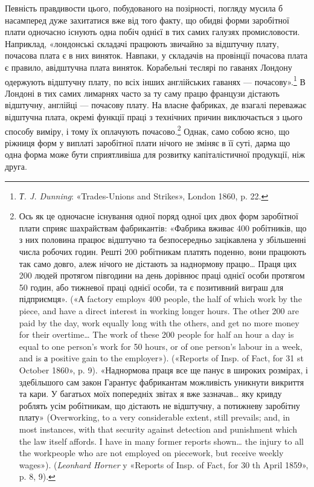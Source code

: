Певність правдивости цього, побудованого на позірності, погляду
мусила б насамперед дуже захитатися вже від того факту,
що обидві форми заробітної плати одночасно існують одна побіч
однієї в тих самих галузях промисловости. Наприклад, «лондонські
складачі працюють звичайно за відштучну плату, почасова
плата є в них виняток. Навпаки, у складачів на провінції
почасова плата є правило, авідштучна плата виняток. Корабельні
теслярі по гаванях Лондону одержують відштучну плату, по
всіх інших англійських гаванях — почасову».\footnote{
\emph{Т. J. Dunning}: «Trades-Unions and Strikes», London 1860,
p. 22.
} В Лондоні в
тих самих лимарнях часто за ту саму працю французи дістають
відштучну, англійці — почасову плату. На власне фабриках,
де взагалі переважає відштучна плата, окремі функції праці з
технічних причин виключається з цього способу виміру, і тому
їх оплачують почасово.\footnote{
Ось як це одночасне існування одної поряд одної цих двох форм
заробітної плати сприяє шахрайствам фабрикантів: «Фабрика вживає
400 робітників, що з них половина працює відштучно та безпосередньо
зацікавлена у збільшенні числа робочих годин. Решті 200 робітникам
платять поденно, вони працюють так само довго, алеж нічого не дістають
за наднормову працю\dots{} Праця цих 200 людей протягом півгодини
на день дорівнює праці однієї особи протягом 50 годин, або  тижневої
праці однієї особи, та є позитивний виграш для підприємця». («А factory
employs 400 people, the half of which work by the piece, and have a direct
interest in working longer hours. The other 200 are paid by the day,
work equally long with the others, and get no more money for their overtime\dots{}
The work of these 200 people for half an hour a day is equal to one
person’s work for 50 hours, or  of one person’s labour in a week, and is
а positive gain to the employer»). («Reports of Insp. of Fact, for 31 st
October 1860», p. 9). «Наднормова праця все ще панує в широких розмірах,
і здебільшого сам закон Гарантує фабрикантам можливість уникнути
викриття та кари. У багатьох моїх попередніх звітах я вже зазначав\dots{}
яку кривду роблять усім робітникам, що дістають не відштучну, а потижневу
заробітну плату» (Overworking, to a very considerable extent,
still prevails; and, in most instances, with that security against detection
and punishment which the law itself affords. I have in many former reports
shown\dots{} the injury to all the workpeople who are not employed on piecework,
but receive weekly wages»). (\emph{Leonhard Horner} y «Reports of Insp.
of Fact, for 30 th April 1859», p. 8, 9).
} Однак, само собою ясно, що ріжниця
форм у виплаті заробітної плати нічого не зміняє в її суті, дарма
що одна форма може бути сприятливіша для розвитку капіталістичної
продукції, ніж друга.

